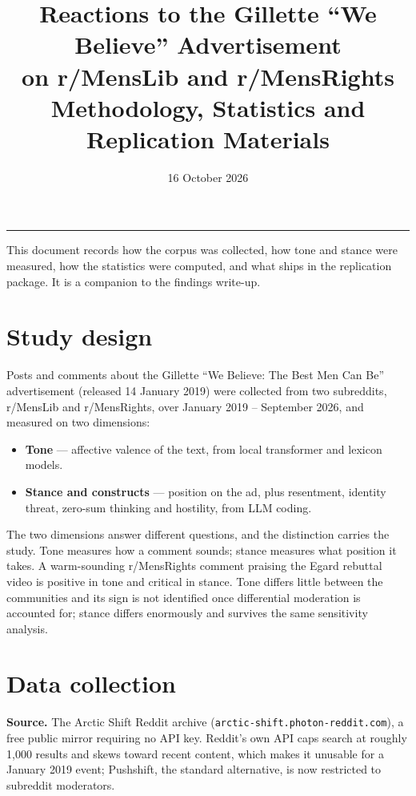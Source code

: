 \documentclass[11pt,a4paper]{article}
\title{\vspace{-1.5cm}\textbf{Reactions to the Gillette ``We Believe'' Advertisement\\
on r/MensLib and r/MensRights}\\[0.3em]
\large Methodology, Statistics and Replication Materials}
\date{\vspace{-0.4em}\normalsize 16 October 2026\vspace{-0.6em}}
\author{}
\newcommand{\code}[1]{\texttt{\small #1}}
\begin{document}
\maketitle
\vspace{-1.1cm}

\noindent\textcolor{rule}{\rule{\linewidth}{0.4pt}}
\vspace{0.8em}

This document records how the corpus was collected, how tone and stance were measured, how the
statistics were computed, and what ships in the replication package. It is a companion to the
findings write-up.

\section{Study design}

Posts and comments about the Gillette ``We Believe: The Best Men Can Be'' advertisement
(released 14 January 2019) were collected from two subreddits, r/MensLib and r/MensRights, over
January 2019 -- September 2026, and measured on two dimensions:

\begin{itemize}
\item \textbf{Tone} --- affective valence of the text, from local transformer and lexicon models.
\item \textbf{Stance and constructs} --- position on the ad, plus resentment, identity threat,
zero-sum thinking and hostility, from LLM coding.
\end{itemize}

The two dimensions answer different questions, and the distinction carries the study. Tone measures
how a comment sounds; stance measures what position it takes. A warm-sounding r/MensRights comment
praising the Egard rebuttal video is positive in tone and critical in stance. Tone differs little
between the communities and its sign is not identified once differential moderation is accounted
for; stance differs enormously and survives the same sensitivity analysis.

\section{Data collection}

\textbf{Source.} The Arctic Shift Reddit archive (\code{arctic-shift.photon-reddit.com}), a free
public mirror requiring no API key. Reddit's own API caps search at roughly 1{,}000 results and
skews toward recent content, which makes it unusable for a January 2019 event; Pushshift, the
standard alternative, is now restricted to subreddit moderators.
\end{document}
